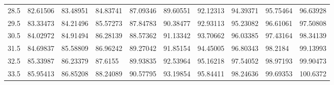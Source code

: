 \documentclass[10pt,twocolumn,letterpaper]{article}
\begin{document}
\begin{table}
\begin{tabular}{llllllllll}
    28.5            & 82.61506                               & 83.48951                               & 84.83741                                & 87.09346                                & 89.60551                                & 92.12313                                & 94.39371                                & 95.75464                                & 96.63928                                \\
    29.5            & 83.33473                               & 84.21496                               & 85.57273                                & 87.84783                                & 90.38477                                & 92.93113                                & 95.23082                                & 96.61061                                & 97.50808                                \\
    30.5            & 84.02972                               & 84.91494                               & 86.28139                                & 88.57362                                & 91.13342                                & 93.70662                                & 96.03385                                & 97.43164                                & 98.34139                                \\
    31.5            & 84.69837                               & 85.58809                               & 86.96242                                & 89.27042                                & 91.85154                                & 94.45005                                & 96.80343                                & 98.2184                                 & 99.13993                                \\
    32.5            & 85.33987                               & 86.23379                               & 87.6155                                 & 89.93835                                & 92.53964                                & 95.16218                                & 97.54052                                & 98.97193                                & 99.90473                                \\
    33.5            & 85.95413                               & 86.85208                               & 88.24089                                & 90.57795                                & 93.19854                                & 95.84411                                & 98.24636                                & 99.69353                                & 100.6372                                \\

\end{tabular}
\end{table}
\end{document}
